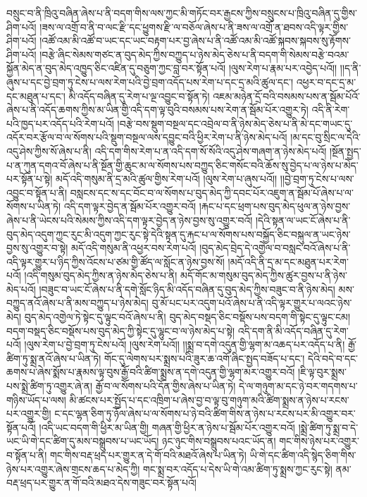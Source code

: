 བསྲུང་བ་ནི་ཁྲིའུ་བཞིན་ཞེས་པ་ནི་བདག་གིས་ལས་ཀྱང་མི་གཏོང་བར་རྒྱངས་ཀྱིས་བསྲུངས་པ་ཁྲིའུ་བཞིན་དུ་གྱིས་ཤིག་པའོ། །ཟས་ལ་འགྲོ་བ་ནི་བ་ལང་རྫི་དང་ཕྱུགས་རྫི་ལ་བཅོལ་ཞེས་པ་ནི་ཟས་ལ་འགྲོ་ན་ཐབས་འདི་ལྟར་གྱིས་ཤིག་པའོ། །འཚོ་འམ་མི་འཚོ་བ་ཡང་དང་ཡང་བརྟག་པར་བྱ་ཞེས་པ་ནི་འཚོ་འམ་མི་འཚོ་སྐབས་སྐབས་སུ་རྟོགས་ཤིག་པའོ། །བརྩེ་ཞིང་སེམས་གཙང་ན་བུད་མེད་ཀྱིས་བཀྱུད་པ་ཉེས་མེད་ཅེས་པ་ནི་བདག་གི་སེམས་བརྩེ་བའམ་སྐྱོན་མེད་ན་བུད་མེད་འཁྱུད་ཅིང་འཛིན་དུ་བཅུག་ཀྱང་བླ་བར་སྟོན་པའོ། །ལུས་རེག་པ་རྣམ་པར་འབྱེད་པའོ།། །།ད་ནི་ཞུས་པ་དང་བྱེ་བྲག་ཏུ་ངེས་པ་ལས་རེག་པའི་བྱེ་བྲག་འདོད་པས་རེག་པ་དང་དྲ་མའི་ཚུལ་དང་། འཕྱར་བ་དང་དྲ་མ་དང་མཐུན་པ་དང་། མི་འདོད་བཞིན་དུ་རེག་པ་ལྔ་འབྱུང་བ་སྟོན་ཏེ། འཇམ་མཉེན་དྲོ་བའི་བསམས་པས་ན་སྦོམ་པོའོ་ཞེས་པ་ནི་འདོད་ཆགས་ཀྱིས་མ་ཡིན་གྱི་འདི་དག་ལྟ་བུའི་བསམས་པས་རེག་ན་སྦོམ་པོར་འགྱུར་ཏེ། འདི་ནི་རེག་པའི་ཁྱད་པར་འདོད་པའི་རེག་པའོ། །བརྩེ་བས་སྡུག་བསྔལ་དང་འབྲེལ་བ་ནི་ཉེས་མེད་ཅེས་པ་ནི་མེ་དང་གཡང་དུ་འདོར་བར་རྩོལ་བ་ལ་སོགས་པའི་སྡུག་བསྔལ་ལས་དབྱུང་བའི་ཕྱིར་རེག་པ་ནི་ཉེས་མེད་པའོ། །མ་དང་བུ་སྲིང་ལ་དེའི་འདུ་ཤེས་ཀྱིས་སོ་ཞེས་པ་ནི། འདི་དག་གིས་རེག་པ་ན་འདི་དག་སོ་སོའི་འདུ་ཤེས་གཞག་ན་ཉེས་མེད་པའོ། །སྔོན་སྤྱད་པ་ན་ཀུན་དགའ་བོ་ཞེས་པ་ནི་སྔོན་གྱི་ཆུང་མ་ལ་སོགས་པས་བཀྱུད་ཅིང་གསོང་བའི་ཆོས་སུ་བྱེད་པ་ལ་ཉེས་པ་མེད་པར་སྟོན་པ་སྟེ། མདོ་འདི་གསུམ་ནི་དྲ་མའི་ཚུལ་གྱིས་རེག་པའོ། །ལུས་རེག་པ་ཞུས་པའོ།། །།བྱེ་བྲག་ཏུ་ངེས་པ་ལས་འབྱུང་བ་སྟོན་པ་ནི། བསླངས་དང་ས་དང་བོང་བ་ལ་སོགས་པ་བུད་མེད་ཀྱི་དབང་པོར་འཇུག་ན་སྦོམ་པོ་ཞེས་པ་ལ་སོགས་པ་ཡིན་ཏེ། འདི་དག་ལྟར་བྱེད་ན་སྦོམ་པོར་འགྱུར་བའོ། །རྐང་པ་དང་ཕྲག་པས་བུད་མེད་ཕུལ་ན་ཉེས་བྱས་ཞེས་པ་ནི་ཡེངས་པའི་སེམས་ཀྱིས་འདི་དག་ལྟར་བྱེད་ན་ཉེས་བྱས་སུ་འགྱུར་བའོ། །དེའི་སྟན་ལ་ཡང་ངོ་ཞེས་པ་ནི་བུད་མེད་འདུག་ཀྱང་རུང་མི་འདུག་ཀྱང་རུང་སྟེ་དེའི་སྟན་དུ་རྐང་པ་ལ་སོགས་པས་བསྐྱོད་ཅིང་བསྐུལ་ན་ཡང་ཉེས་བྱས་སུ་འགྱུར་བ་སྟེ། མདོ་འདི་གསུམ་ནི་འཕྱར་བས་རེག་པའོ། །བུད་མེད་བྲེད་དེ་འགྱེལ་བ་བསླང་བའོ་ཞེས་པ་ནི་འདི་ལྟར་གྱུར་པ་ཉིད་ཀྱིས་འོངས་པ་ཙམ་གྱི་ཚོད་ལ་སློང་ན་ཉེས་བྱས་སོ། །མདོ་འདི་ནི་དྲ་མ་དང་མཐུན་པར་རེག་པའོ། །འདི་གསུམ་བུད་མེད་ཀྱིས་ན་ཉེས་མེད་ཅེས་པ་ནི། མདོ་གོང་མ་གསུམ་བུད་མེད་ཀྱིས་ཚུར་བྱས་པ་ནི་ཉེས་མེད་པའོ། །བཟུང་བ་ཡང་ངོ་ཞེས་པ་ནི་དགེ་སློང་ཉིད་མི་འདོད་བཞིན་དུ་བུད་མེད་ཀྱིས་བཟུང་བ་ནི་ཉེས་མེད། མས་བཀྱུད་ནའོ་ཞེས་པ་ནི་མས་བཀྱུད་པ་ཉེས་མེད། བུ་མོ་པང་པར་འདུག་པའོ་ཞེས་པ་ནི་འདི་ལྟར་གྱུར་པ་ལའང་ཉེས་མེད། བུད་མེད་འགྱེལ་ཏེ་སྟེང་དུ་ལྟུང་བའོ་ཞེས་པ་ནི། བུད་མེད་བསྡད་ཅིང་བསྡོས་པས་བདག་གི་སྟེང་དུ་ལྟུང་ངམ། བདག་བསྡད་ཅིང་བསྡོས་པས་བུད་མེད་ཀྱི་སྟེང་དུ་ལྷུང་བ་ལ་ཉེས་མེད་པ་སྟེ། འདི་དག་ནི་མི་འདོད་བཞིན་དུ་རེག་པའོ། །ལུས་རེག་པ་བྱེ་བྲག་ཏུ་ངེས་པའོ། །ལུས་རེག་པའོ།། །།སྨྲ་བ་དགེ་འདུན་གྱི་ལྷག་མ་འཆད་པར་འདོད་པ་ནི། རྒྱོ་ཚིག་ཏུ་སྨྲ་ནའོ་ཞེས་པ་ཡིན་ཏེ། གོང་དུ་ལེགས་པར་སྨྲས་པའི་ཟུར་ཆ་འགོ་ཞིང་སྤྱད་བཟོད་པ་དང་། དེའི་བདེ་བ་དང་ཆགས་པ་ཞེས་སྨོས་པ་རྣམས་ལྟ་བུས་རྒྱོ་བའི་ཚིག་སྨྲས་ན་དགེ་འདུན་གྱི་ལྷག་མར་འགྱུར་བའོ། །ཇི་ལྟ་བུར་སྨྲས་པས་སྨྲེ་ཚིག་ཏུ་འགྱུར་ཞེ་ན། རྒྱོ་བ་ལ་སོགས་པའི་དོན་གྱིས་ཞེས་པ་ཡིན་ཏེ། དེ་ལ་གཉུག་མ་དང་ཉེ་བར་གདགས་པ་གཉིས་ཡོད་པ་ལས། མི་ཚངས་པར་སྤྱོད་པ་དང་འཁྲིག་པ་ཞེས་བྱ་བ་ལྟ་བུ་གཉུག་མའི་ཚིག་སྨྲས་ན་ཉེས་པ་རངས་པར་འགྱུར་གྱི། ང་དང་ལྷན་ཅིག་ཏུ་ཉོལ་ཞེས་པ་ལ་སོགས་པ་ཉེ་བའི་ཚིག་གིས་ན་ཉེས་པ་རངས་པར་མི་འགྱུར་བར་སྟོན་པའོ། །འདི་ཡང་བདག་གི་ཕྱིར་མ་ཡིན་གྱི། གཞན་གྱི་ཕྱིར་ན་ཉེས་པ་སྦོམ་པོར་འགྱུར་བའོ། །སྨྲེ་ཚིག་ཏུ་སྨྲ་བ་དེ་ཡང་ཡི་གེ་དང་ཚིག་དུ་མས་བསྒྲུབས་པ་ཡང་ཡོད། ཉང་ཉུང་གིས་བསྒྲུབས་པའང་ཡོད་ན། གང་གིས་ཉེས་པར་འགྱུར་བ་སྟོན་པ་ནི། གང་གིས་བརྡ་ཕྲད་པར་གྱུར་ན་དེ་གོ་བའི་མཐའོ་ཞེས་པ་ཡིན་ཏེ། ཡི་གེ་དང་ཚིག་འདི་སྙེད་ཅིག་གིས་ཉེས་པར་འགྱུར་ཞེས་གྲངས་ཆད་པ་མེད་ཀྱི། གང་སྨྲ་བར་འདོད་པ་དེས་ཡི་གེ་འམ་ཚིག་ཏུ་སྨྲས་ཀྱང་རུང་སྟེ། ནམ་བརྡ་ཕྲད་པར་གྱུར་ན་གོ་བའི་མཐའ་དེས་གཟུང་བར་སྟོན་པའོ། 